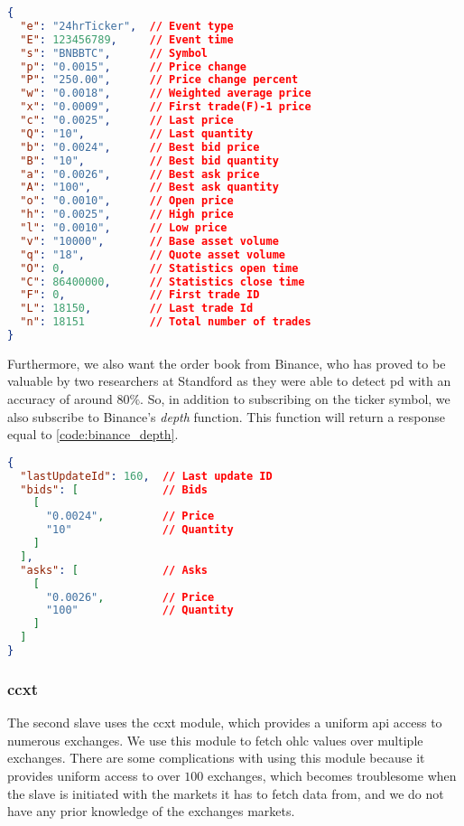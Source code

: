 \begin{lstlisting}[language=json, caption={Ticker response from Binance (Source \cite{binance_git})}, label=code:binance_tick]
{
  "e": "24hrTicker",  // Event type
  "E": 123456789,     // Event time
  "s": "BNBBTC",      // Symbol
  "p": "0.0015",      // Price change
  "P": "250.00",      // Price change percent
  "w": "0.0018",      // Weighted average price
  "x": "0.0009",      // First trade(F)-1 price
  "c": "0.0025",      // Last price
  "Q": "10",          // Last quantity
  "b": "0.0024",      // Best bid price
  "B": "10",          // Best bid quantity
  "a": "0.0026",      // Best ask price
  "A": "100",         // Best ask quantity
  "o": "0.0010",      // Open price
  "h": "0.0025",      // High price
  "l": "0.0010",      // Low price
  "v": "10000",       // Base asset volume
  "q": "18",          // Quote asset volume
  "O": 0,             // Statistics open time
  "C": 86400000,      // Statistics close time
  "F": 0,             // First trade ID
  "L": 18150,         // Last trade Id
  "n": 18151          // Total number of trades
}
\end{lstlisting}

Furthermore, we also want the order book from Binance, who has proved to be valuable by two researchers at Standford as they were able to detect \ac{pd} with an accuracy of around $80\%$. So, in addition to subscribing on the ticker symbol, we also subscribe to Binance's \emph{depth} function. This function will return a response equal to \autoref{code:binance_depth}.

\begin{lstlisting}[language=json, caption={Depth response from Binance (Source \cite{binance_git})}, label=code:binance_depth]
{
  "lastUpdateId": 160,  // Last update ID
  "bids": [             // Bids
    [
      "0.0024",         // Price
      "10"              // Quantity
    ]
  ],
  "asks": [             // Asks
    [
      "0.0026",         // Price
      "100"             // Quantity
    ]
  ]
}
\end{lstlisting}

\subsubsection{ccxt}
The second slave uses the ccxt module, which provides a uniform \ac{api} access to numerous exchanges. We use this module to fetch \ac{ohlc} values over multiple exchanges. There are some complications with using this module because it provides uniform access to over $100$ exchanges, which becomes troublesome when the slave is initiated with the markets it has to fetch data from, and we do not have any prior knowledge of the exchanges markets.

